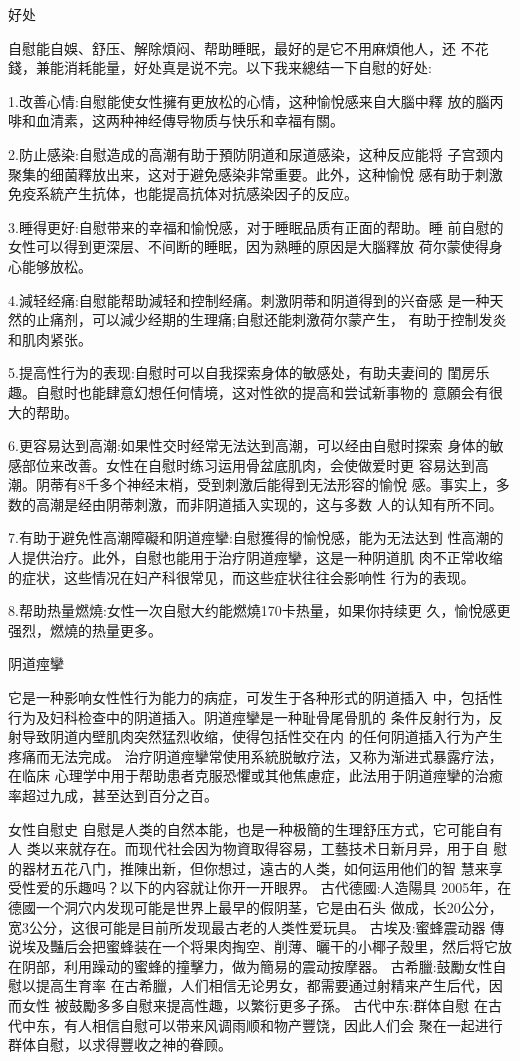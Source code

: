 \documentclass[12pt,UTF8]{ctexbook}
\begin{document}
好处

自慰能自娛、舒压、解除煩闷、帮助睡眠，最好的是它不用麻煩他人，还
不花錢，兼能消耗能量，好处真是说不完。以下我来總结一下自慰的好处:

1.改善心情:自慰能使女性擁有更放松的心情，这种愉悅感来自大腦中釋
放的腦丙啡和血清素，这两种神经傳导物质与快乐和幸福有關。

2.防止感染:自慰造成的高潮有助于預防阴道和尿道感染，这种反应能将
子宫颈内聚集的细菌釋放出来，这对于避免感染非常重要。此外，这种愉悅
感有助于刺激免疫系統产生抗体，也能提高抗体对抗感染因子的反应。

3.睡得更好:自慰带来的幸福和愉悅感，对于睡眠品质有正面的帮助。睡
前自慰的女性可以得到更深层、不间断的睡眠，因为熟睡的原因是大腦釋放
荷尔蒙使得身心能够放松。

4.減轻经痛:自慰能帮助減轻和控制经痛。刺激阴蒂和阴道得到的兴奋感
是一种天然的止痛剂，可以減少经期的生理痛;自慰还能刺激荷尔蒙产生，
有助于控制发炎和肌肉紧张。

5.提高性行为的表现:自慰时可以自我探索身体的敏感处，有助夫妻间的
閨房乐趣。自慰时也能肆意幻想任何情境，这对性欲的提高和尝试新事物的
意願会有很大的帮助。

6.更容易达到高潮:如果性交时经常无法达到高潮，可以经由自慰时探索
身体的敏感部位来改善。女性在自慰时练习运用骨盆底肌肉，会使做爱时更
容易达到高潮。阴蒂有8千多个神经末梢，受到刺激后能得到无法形容的愉悅
感。事实上，多数的高潮是经由阴蒂刺激，而非阴道插入实现的，这与多数
人的认知有所不同。

7.有助于避免性高潮障礙和阴道痙攣:自慰獲得的愉悅感，能为无法达到
性高潮的人提供治疗。此外，自慰也能用于治疗阴道痙攣，这是一种阴道肌
肉不正常收缩的症状，这些情况在妇产科很常见，而这些症状往往会影响性
行为的表现。

8.帮助热量燃燒:女性一次自慰大约能燃燒170卡热量，如果你持续更
久，愉悅感更强烈，燃燒的热量更多。

阴道痙攣

它是一种影响女性性行为能力的病症，可发生于各种形式的阴道插入
中，包括性行为及妇科检查中的阴道插入。阴道痙攣是一种耻骨尾骨肌的
条件反射行为，反射导致阴道内壁肌肉突然猛烈收缩，使得包括性交在内
的任何阴道插入行为产生疼痛而无法完成。
治疗阴道痙攣常使用系統脱敏疗法，又称为渐进式暴露疗法，在临床
心理学中用于帮助患者克服恐懼或其他焦慮症，此法用于阴道痙攣的治癒
率超过九成，甚至达到百分之百。

女性自慰史
自慰是人类的自然本能，也是一种极簡的生理舒压方式，它可能自有人
类以来就存在。而现代社会因为物資取得容易，工藝技术日新月异，用于自
慰的器材五花八门，推陳出新，但你想过，遠古的人类，如何运用他们的智
慧来享受性爱的乐趣吗？以下的内容就让你开一开眼界。
古代德國:人造陽具
2005年，在德國一个洞穴内发现可能是世界上最早的假阴茎，它是由石头
做成，长20公分，宽3公分，这很可能是目前所发现最古老的人类性爱玩具。
古埃及:蜜蜂震动器
傳说埃及豔后会把蜜蜂装在一个将果肉掏空、削薄、曬干的小椰子殼里，然后将它放在阴部，利用躁动的蜜蜂的撞擊力，做为簡易的震动按摩器。
古希臘:鼓勵女性自慰以提高生育率
在古希臘，人们相信无论男女，都需要通过射精来产生后代，因而女性
被鼓勵多多自慰来提高性趣，以繁衍更多子孫。
古代中东:群体自慰
在古代中东，有人相信自慰可以带来风调雨顺和物产豐饶，因此人们会
聚在一起进行群体自慰，以求得豐收之神的眷顾。
\end{document}
